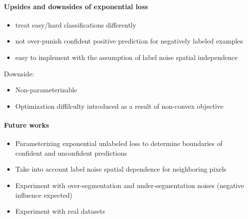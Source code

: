 \paragraph{Upsides and downsides of exponential loss}
\begin{itemize}
  \item treat easy/hard classifications differently
  \item not over-punish confident positive prediction for negatively labeled examples
  \item easy to implement with the assumption of label noise spatial independence
\end{itemize}


Downside:
\begin{itemize}
  \item Non-parameterizable
  \item Optimization diffilculty introduced as a result of non-convex objective
\end{itemize}


\paragraph{Future works}

\begin{itemize}
  \item Parameterizing exponential unlabeled loss to determine boundaries of confident and unconfident predictions
  \item Take into account label noise spatial dependence for neighboring pixels
  \item Experiment with over-segmentation and under-segmentation noises (negative influence expected)
  \item Experiment with real datasets
\end{itemize}
